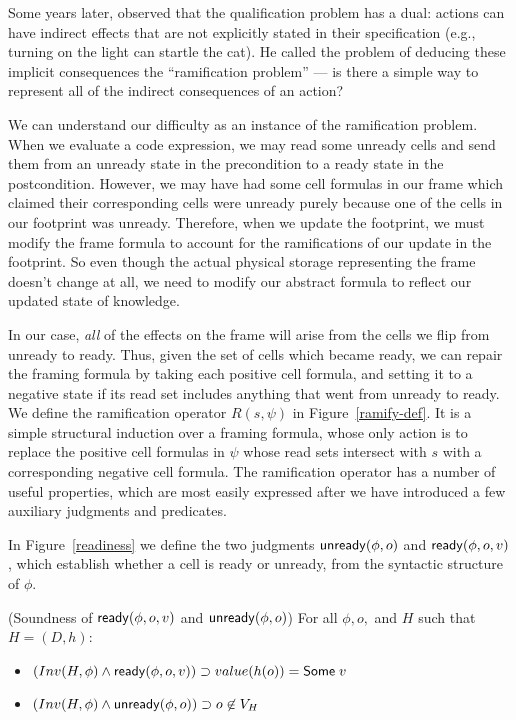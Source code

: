 Some years later, \citet{finger} observed that the qualification
problem has a dual: actions can have indirect effects that are not
explicitly stated in their specification (e.g., turning on the light can
startle the cat). He called the problem of deducing these implicit
consequences the ``ramification problem'' --- is there a simple way to
represent all of the indirect consequences of an action?

We can understand our difficulty as an instance of the ramification
problem. When we evaluate a code expression, we may read some unready
cells and send them from an unready state in the precondition to a ready
state in the postcondition. However, we may have had some cell formulas in
our frame which claimed their corresponding cells were unready purely
because one of the cells in our footprint was unready. Therefore, when
we update the footprint, we must modify the frame formula to account
for the ramifications of our update in the footprint. So even though
the actual physical storage representing the frame doesn't change at all, 
we need to modify our abstract formula to reflect our updated state
of knowledge. 

In our case, \emph{all} of the effects on the frame will arise from
the cells we flip from unready to ready. Thus, given the set of cells
which became ready, we can repair the framing formula by taking each
positive cell formula, and setting it to a negative state if its read
set includes anything that went from unready to ready. We define the
ramification operator $R(s, \psi)$ in Figure~\ref{ramify-def}.  It is
a simple structural induction over a framing formula, whose only
action is to replace the positive cell formulas in $\psi$ whose read
sets intersect with $s$ with a corresponding negative cell formula.
The ramification operator has a number of useful properties, which are
most easily expressed after we have introduced a few auxiliary
judgments and predicates.

In Figure~\ref{readiness} we define the two judgments $\mathsf{unready}({\phi}, {o})$
and $\mathsf{ready}({\phi}, {o}, {v})$, which establish whether a cell is ready or
unready, from the syntactic structure of $\phi$. 

\begin{prop}{(Soundness of $\mathsf{ready}({\phi}, {o}, {v})$ and $\mathsf{unready}({\phi}, {o})$)}
For all $\phi, o,$ and $H$ such that $H = (D,h)$:

\begin{itemize}
\item $(Inv(H, \phi) \land \mathsf{ready}({\phi}, {o}, {v})) \supset value(h(o)) = \mathsf{Some}\;v$
\item $(Inv(H, \phi) \land \mathsf{unready}({\phi}, {o})) \supset o \not\in V_H$
\end{itemize}
\end{prop}

